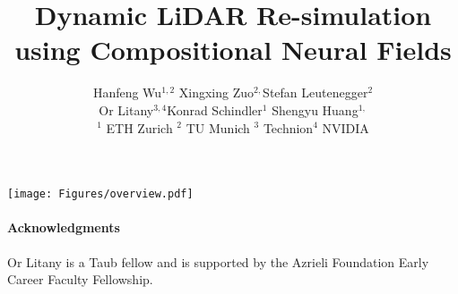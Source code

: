 \documentclass[10pt,twocolumn,letterpaper]{article}
\title{Dynamic LiDAR Re-simulation using Compositional Neural Fields}
\author{
Hanfeng Wu$^{1,2}$ \quad Xingxing Zuo$^{2,}$\footnotemark[1]\quad Stefan Leutenegger$^{2}$\\ 
Or Litany$^{3,4}$\quad Konrad Schindler$^{1}$ \quad Shengyu Huang$^{1,}$\footnotemark[1]\\
{\small $^{1}$ ETH Zurich \quad $^{2}$ TU Munich \quad $^{3}$ Technion\quad $^{4}$ NVIDIA
}
}
\newcommand{\dynfl}{DyNFL\xspace}
\newcommand{\dynfl}{DyNFL\xspace}
\begin{document}
\renewcommand{\thefootnote}{*}
\maketitle
{}
\begin{figure*}[t]
    \centering
        \texttt{[image: Figures/overview.pdf]}
        
        \caption{
        Overview of \dynfl. Our method takes LiDAR scans and tracked bounding boxes of dynamic vehicles as input. \dynfl first decomposes the scene into a static background and $N$ dynamic vehicles, each modelled using a dedicated neural field. These neural fields are then composed to re-simulate LiDAR scans in dynamic scenes. Our composition technique supports various scene edits, including altering object trajectories, removing and adding reconstructed neural assets between scenes.
    }
    \label{fig:main}
\end{figure*}
\begin{abstract}


\end{abstract}




% 

% 





\paragraph{Acknowledgments}
Or Litany is a Taub fellow and is supported by the Azrieli Foundation Early Career Faculty Fellowship.

{\small


}
\end{document}
